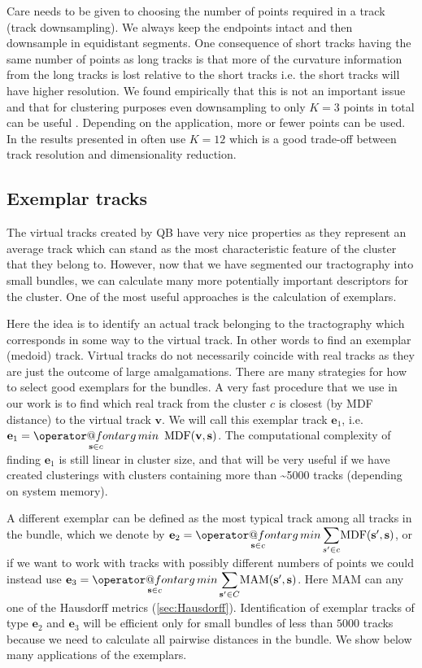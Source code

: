 \documentclass[journal]{IEEEtran}
\makeatletter
\def\argmin{\mathop{\operator@font arg\,min}}
\makeatother
\begin{document}
Care needs to be given to choosing the number of points required in a
track (track downsampling). We always keep the endpoints intact and then
downsample in equidistant segments. One consequence of short tracks
having the same number of points as long tracks is that more of the
curvature information from the long tracks is lost relative to the short
tracks i.e. the short tracks will have higher resolution.  We found
empirically that this is not an important issue and that for clustering
purposes even downsampling to only $K=3$ points in total can be useful
\cite{EGMB10}. Depending on the application, more or fewer points can
be used. In the results presented in often use $K=12$ which is a good trade-off 
between track resolution and dimensionality reduction.


\subsection{Exemplar tracks\label{sub:exemplars}}

The virtual tracks created by QB have very nice properties as they
represent an average track which can stand as the most characteristic
feature of the cluster that they belong to. However, now that we have
segmented our tractography into small bundles, we can calculate many more
potentially important descriptors for the cluster. One of the most
useful approaches is the calculation of exemplars.

Here the idea is to identify an actual track belonging to the
tractography which corresponds in some way to the virtual track. In
other words to find an exemplar (medoid) track. Virtual tracks do not
necessarily coincide with real tracks as they are just the outcome of
large amalgamations. There are many strategies for how to select good
exemplars for the bundles. A very fast procedure that we use in our
work is to find which real track from the cluster $c$ is closest (by MDF
distance) to the virtual track $\mathbf{v}$. We will call this exemplar track $\mathbf{e}_{1}$,
i.e.~$\mathbf{e}_{1}={\displaystyle \argmin_{\mathbf{s} \in c}}\textrm{\,\ MDF}(\mathbf{v},\mathbf{s})$.
The computational complexity of finding $\mathbf{e}_{1}$ is still linear in
cluster size, and that will be very useful if we have created
clusterings with clusters containing more than \textasciitilde5000 tracks
(depending on system memory).

A different exemplar can be defined as the most typical track among all
tracks in the bundle, which we denote by $\mathbf{e}_{2}={\displaystyle
  \argmin_{\mathbf{s} \in c}}\,{\displaystyle \sum_{s'\in c}}\mathrm{MDF}(\mathbf{s'},\mathbf{s})$, or
if we want to work with tracks with possibly different numbers of points
we could instead use $\mathbf{e}_{3}={\displaystyle \argmin_{\mathbf{s} \in
    c}}\,{\displaystyle \sum_{\mathbf{s'}\in C}}\mathrm{MAM}(\mathbf{s'},\mathbf{s})$.
Here $\mathrm{MAM}$ can any one of the Hausdorff metrics (\ref{sec:Hausdorff}).
Identification of exemplar tracks of type $\mathbf{e}_{2}$ and $\mathbf{e}_{3}$ will be
efficient only for small bundles of less than $5000$ tracks because we
need to calculate all pairwise distances in the bundle. We show below
many applications of the exemplars. 
\end{document}
